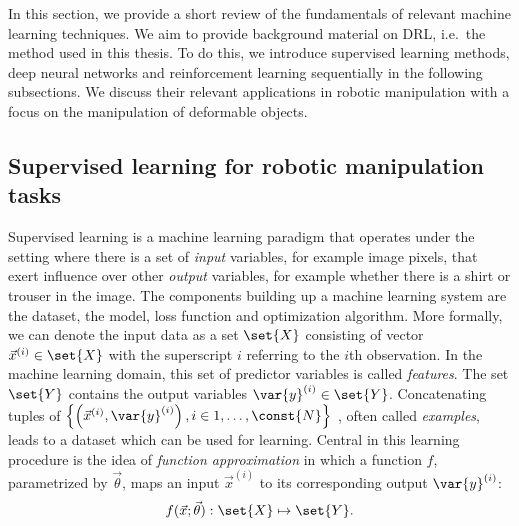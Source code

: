 \documentclass[\home/main.tex]{subfiles}
\begin{document}
In this section, we provide a short review of the fundamentals of relevant machine learning techniques. We aim to provide background material on \gls{DRL}, i.e.\ the method used in this thesis. To do this, we introduce supervised learning methods, deep neural networks and reinforcement learning sequentially in the following subsections. We discuss their relevant applications in robotic manipulation with a focus on the manipulation of deformable objects. %

\subsection{Supervised learning for robotic manipulation tasks} \label{subsec:lit_sl}
Supervised learning is a machine learning paradigm that operates under the setting where there is a set of \textit{input} variables, for example image pixels, that exert influence over other \textit{output} variables, for example whether there is a shirt or trouser in the image.
The components building up a machine learning system are the dataset, the model, loss function and optimization algorithm.
More formally, we can denote the input data as a set $\set{X}$ consisting of vector $\vec{x}^{(i)} \in \set{X} $ with the superscript $i$ referring to the $i$th observation. In the machine learning domain, this set of predictor variables is called \textit{features}. The set $\set{Y}$ contains the output variables $\var{y}^{(i)} \in \set{Y}$. Concatenating tuples of
$\left\{\left(\vec{x}^{(i)}, \var{y}^{(i)}\right) , i \in 1,\dots,\const{N} \right\}$
, often called \textit{examples}, leads to a dataset which can be used for learning. Central in this learning procedure is the idea of \textit{function approximation} in which a function $f$, parametrized by $\vec{\theta}$, maps an input $\vec{x}^{(i)}$ to its corresponding output $\var{y}^{(i)}$:
\begin{equation*}
	f(\vec{x};\vec{\theta}): \set{X} \mapsto \set{Y}\text{.}
\end{equation*}
\end{document}
